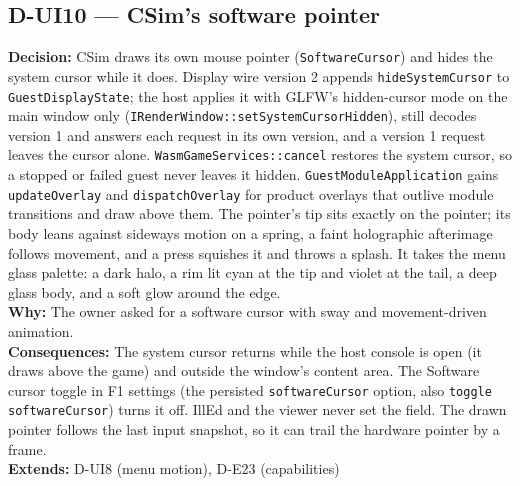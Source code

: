 \subsection*{D-UI10 --- CSim's software pointer}
\begin{decisionbox}[title={D-UI10 \quad 2026-09-24}]
\textbf{Decision:} CSim draws its own mouse pointer (\texttt{SoftwareCursor})
and hides the system cursor while it does. Display wire version 2 appends
\texttt{hideSystemCursor} to \texttt{GuestDisplayState}; the host applies it
with GLFW's hidden-cursor mode on the main window only
(\texttt{IRenderWindow::setSystemCursorHidden}), still decodes version 1 and
answers each request in its own version, and a version 1 request leaves the
cursor alone. \texttt{WasmGameServices::cancel} restores the system cursor, so
a stopped or failed guest never leaves it hidden.
\texttt{GuestModuleApplication} gains \texttt{updateOverlay} and
\texttt{dispatchOverlay} for product overlays that outlive module transitions
and draw above them. The pointer's tip sits exactly on the pointer; its body
leans against sideways motion on a spring, a faint holographic afterimage
follows movement, and a press squishes it and throws a splash. It takes the menu
glass palette: a dark halo, a rim lit cyan at the tip and violet at the tail,
a deep glass body, and a soft glow around the edge.\\
\textbf{Why:} The owner asked for a software cursor with sway and
movement-driven animation.\\
\textbf{Consequences:} The system cursor returns while the host console is
open (it draws above the game) and outside the window's content area.
The Software cursor toggle in F1 settings (the persisted
\texttt{softwareCursor} option, also \texttt{toggle softwareCursor}) turns it
off.
IllEd and the viewer never set the field. The drawn pointer follows the last
input snapshot, so it can trail the hardware pointer by a frame.\\
\textbf{Extends:} D-UI8 (menu motion), D-E23 (capabilities)
\end{decisionbox}

